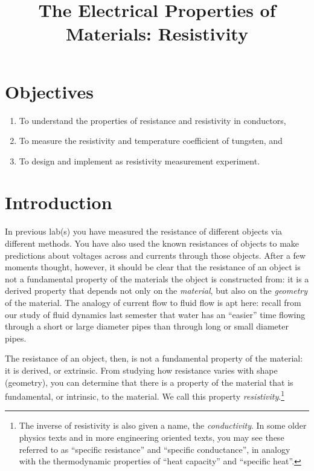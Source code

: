 \documentclass[12pt]{article}
\title{The Electrical Properties of Materials: Resistivity}
\author{}
\date{}
\begin{document}
\maketitle

\section{Objectives}
\label{sec:objectives}

\begin{enumerate}
\item To understand the properties of resistance and resistivity in
  conductors, 
\item To measure the resistivity and temperature coefficient of
  tungsten, and
\item To design and implement as resistivity measurement experiment. 
\end{enumerate}

\section{Introduction}
\label{sec:introduction}

In previous lab(s) you have measured the resistance of different
objects via different methods.  You have also used the known
resistances of objects to make predictions about voltages across and
currents through those objects.  After a few moments thought, however,
it should be clear that the resistance of an object is not a
fundamental property of the materials the object is constructed from:
it is a derived property that depends not only on the
\textit{material}, but also on the \textit{geometry} of the material.
The analogy of current flow to fluid flow is apt here: recall from our
study of fluid dynamics last semester that water has an ``easier''
time flowing through a short or large diameter pipes than through long
or small diameter pipes.

The resistance of an object, then, is not a fundamental property of
the material: it is derived, or extrinsic.  From studying how
resistance varies with shape (geometry), you can determine that there
is a property of the material that is fundamental, or intrinsic, to
the material.  We call this property
\textit{resistivity}.\footnote{The inverse of resistivity is also
  given a name, the \textit{conductivity}.  In some older physics
  texts and in more engineering oriented texts, you may see these
  referred to as ``specific resistance'' and ``specific conductance'',
  in analogy with the thermodynamic properties of ``heat capacity''
  and ``specific heat''.}
\end{document}
